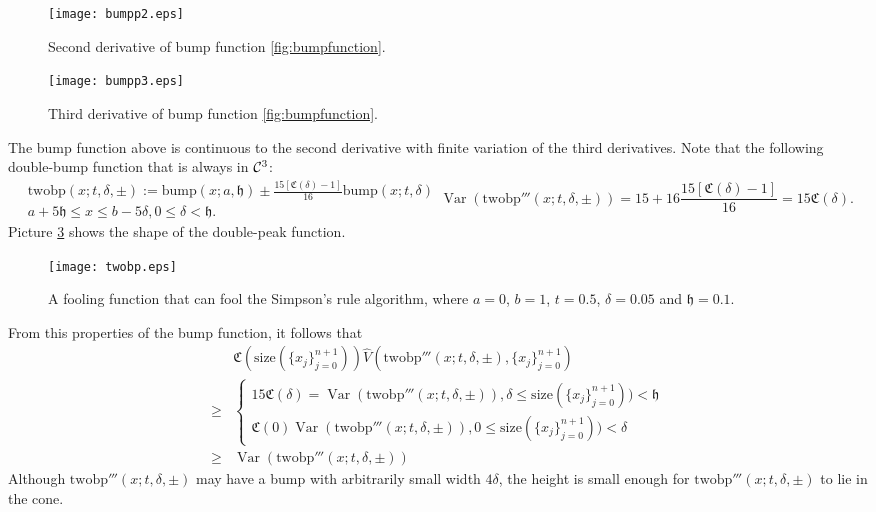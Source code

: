 \documentclass{iitthesis}
\DeclareMathOperator{\Var}{Var}
\theoremstyle{definition}
\theoremstyle{remark}
\begin{document}
\begin{figure}[ht]
\centering
\texttt{[image: bumpp2.eps]}
\caption{Second derivative of bump function \ref{fig:bumpfunction}. \label{fig:bumpp2}}
\end{figure}
\begin{figure}[ht]
\centering
\texttt{[image: bumpp3.eps]}
\caption{Third derivative of bump function \ref{fig:bumpfunction}. \label{fig:bumpp3}}
\end{figure}
The bump function above is continuous to the second derivative with finite variation of the third derivatives. Note that the following double-bump function that is always in $\mathcal{C}^3$:
\begin{subequations}
    \begin{multline}\label{foolingfunctionsim}
        \text{twobp}(x;t,\delta,\pm):=\text{bump}(x;a,\mathfrak{h})\pm\frac{15[\mathfrak{C}(\delta)-1]}{16}\text{bump}(x;t,\delta)\\ a+5\mathfrak{h}\le x \le b-5\delta, 0\le \delta <\mathfrak{h}.
    \end{multline}
    \begin{equation}
        \Var(\text{twobp}'''(x;t,\delta,\pm))=15+16\frac{15[\mathfrak{C}(\delta)-1]}{16}=15\mathfrak{C}(\delta).
    \end{equation}
\end{subequations}
Picture \ref{fig:twobpfunction} shows the shape of the double-peak function.
\begin{figure}[ht]
\centering
\texttt{[image: twobp.eps]}
\caption{A fooling function that can fool the Simpson's rule algorithm, where $a=0$, $b=1$, $t=0.5$, $\delta=0.05$ and $\mathfrak{h}=0.1$. \label{fig:twobpfunction}}
\end{figure}

From this properties of the bump function, it follows that
\begin{align*}
  &\mathfrak{C}(\text{size}(\{x_j\}_{j=0}^{n+1}))\widehat{V}(\text{twobp}'''(x;t,\delta,\pm),\{x_j\}_{j=0}^{n+1})\\
  \ge & \begin{cases} \displaystyle 15\mathfrak{C}(\delta)=\Var(\text{twobp}'''(x;t,\delta,\pm)), \delta \le \text{size}(\{x_j\}_{j=0}^{n+1})) <\mathfrak{h}\\[1ex]
                      \displaystyle \mathfrak{C}(0)\Var(\text{twobp}'''(x;t,\delta,\pm)), 0\le \text{size}(\{x_j\}_{j=0}^{n+1}))<\delta
        \end{cases}\\
  \ge & \Var(\text{twobp}'''(x;t,\delta,\pm))
\end{align*}
Although $\text{twobp}'''(x;t,\delta,\pm)$ may have a bump with arbitrarily small width $4\delta$, the height is small enough for $\text{twobp}'''(x;t,\delta,\pm)$ to lie in the cone.
\end{document}
